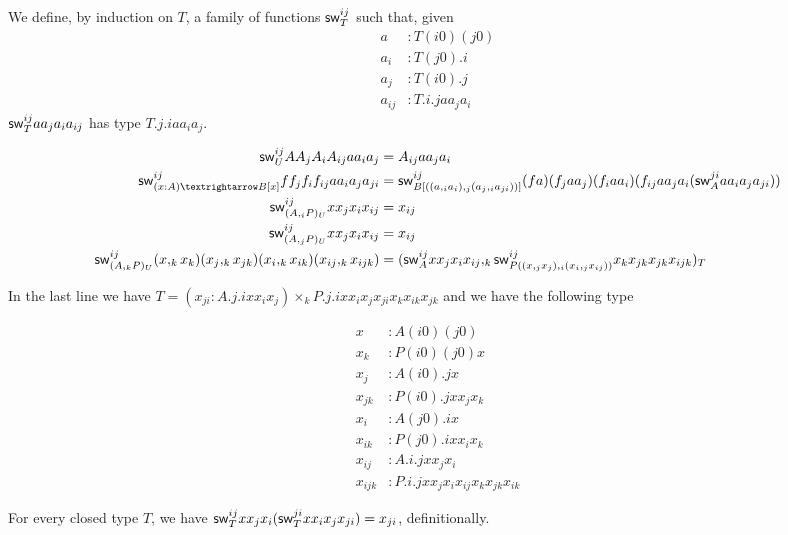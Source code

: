 \documentclass[10pt,a4paper]{article}
\begin{document}
\begin{definition}[$\sw i j T$]
We define, by induction on $T$, a family of functions $\sw i j T$
such that, given 
\begin{align*}
  a &: T (i0) (j0) \\
  a_i &: T (j0).i \\
  a_j &: T (i0).j \\
  a_{ij} &: T.i.j a a_j a_i 
\end{align*}
$\mathsf{sw}^{ij}_{T} a a_j a_i a_{ij}$ has type  $T.j.i a a_i a_j$.

\begin{align*}
  \sw i j {U} A A_j A_i A_{ij} a a_i a_j & = A_{ij} a a_j a_i  \\
  \sw i j {(x:A) → B[x]} f f_j f_i f_{ij} a a_i a_j a_{ji} & = \sw i j {B[((a,_ia_i),_j(a_j,_ia_{ji}))]} (f a)
(f_j a a_j) (f_i a a_i) (f_{ij} a a_j a_i (\sw j i A a a_i a_j a_{ji})) \\
  \sw i j {(A ,_i P)_U} x x_j x_i x_{ij} & = x_{ij} \\
  \sw i j {(A ,_j P)_U} x x_j x_i x_{ij} & = x_{ij} \\
  \sw i j {(A ,_k P)_U} (x ,_k x_k) (x_j ,_k x_{jk}) (x_i ,_k x_{ik}) (x_{ij},_k x_{ijk}) & = 
    (\sw i j A x x_j x_i x_{ij},_k \sw i j {P ((x,_jx_j),_i(x_i,_j x_{ij}))} x_k x_{jk} x_{jk} x_{ijk})_T
\end{align*}
\end{definition}

 In the last line we have $T = (x_{ji}:A.j.i x x_i x_j) \times_k P.j.i x x_i x_j x_{ji} x_k x_{ik} x_{jk}$
and we have the following type

\begin{align*}
 x &: A(i0)(j0) \\
 x_k &: P(i0)(j0) x \\
 x_j &: A(i0).j x \\
 x_{jk} &: P(i0).j x x_j x_k \\
 x_i &: A(j0).i x \\
 x_{ik} &: P(j0).i x x_i x_k \\
 x_{ij} &: A.i.j x x_j x_i \\
 x_{ijk} &: P.i.j x x_j x_i x_{ij} x_k x_{jk} x_{ik}
\end{align*}




\begin{theorem}
For every closed type $T$, we have $\mathsf{sw}^{ij}_{T} x x_j x_i (\mathsf{sw}^{ji}_{T} x x_i x_j x_{ji}) = x_{ji}$, definitionally.
\end{theorem}
\end{document}
